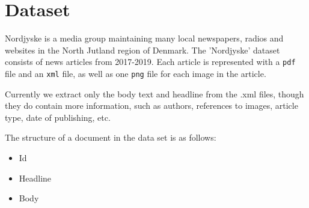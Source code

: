 \section{Dataset}
Nordjyske is a media group maintaining many local newspapers, radios and websites in the North Jutland region of Denmark.
The 'Nordjyske' dataset consists of news articles from 2017-2019. 
Each article is represented with a \texttt{pdf} file and an \texttt{xml} file, as well as one \texttt{png} file for each image in the article.

Currently we extract only the body text and headline from the .xml files, though they do contain more information, such as authors, references to images, article type, date of publishing, etc.

The structure of a document in the data set is as follows:
\begin{itemize}
	\item Id
	\item Headline
	\item Body
\end{itemize}
